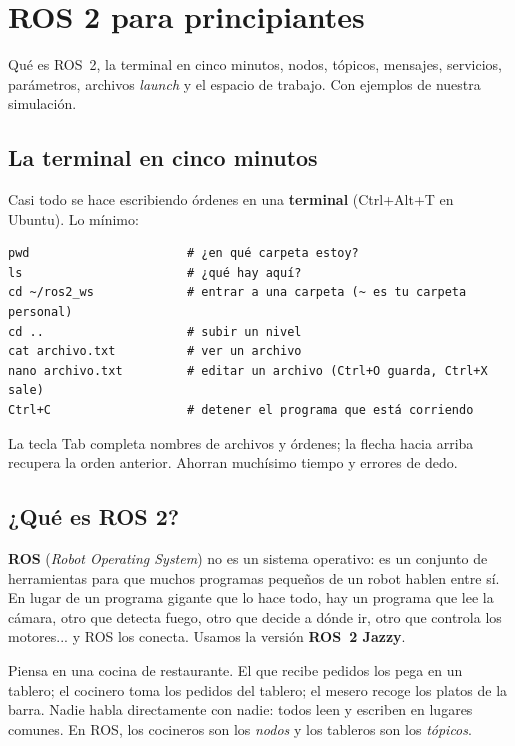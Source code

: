 \chapter{ROS 2 para principiantes}

\begin{enpocas}
Qué es ROS~2, la terminal en cinco minutos, nodos, tópicos, mensajes, servicios, parámetros,
archivos \emph{launch} y el espacio de trabajo. Con ejemplos de nuestra simulación.
\end{enpocas}

\section{La terminal en cinco minutos}

Casi todo se hace escribiendo órdenes en una \textbf{terminal} (Ctrl+Alt+T en Ubuntu). Lo mínimo:

\begin{lstlisting}[style=bash]
pwd                      # ¿en qué carpeta estoy?
ls                       # ¿qué hay aquí?
cd ~/ros2_ws             # entrar a una carpeta (~ es tu carpeta personal)
cd ..                    # subir un nivel
cat archivo.txt          # ver un archivo
nano archivo.txt         # editar un archivo (Ctrl+O guarda, Ctrl+X sale)
Ctrl+C                   # detener el programa que está corriendo
\end{lstlisting}

\begin{consejo}
La tecla Tab completa nombres de archivos y órdenes; la flecha hacia arriba recupera la orden
anterior. Ahorran muchísimo tiempo y errores de dedo.
\end{consejo}

\section{¿Qué es ROS 2?}

\textbf{ROS} (\emph{Robot Operating System}) no es un sistema operativo: es un conjunto de
herramientas para que muchos programas pequeños de un robot hablen entre sí. En lugar de un programa
gigante que lo hace todo, hay un programa que lee la cámara, otro que detecta fuego, otro que decide
a dónde ir, otro que controla los motores... y ROS los conecta. Usamos la versión \textbf{ROS~2
Jazzy}.

\begin{ejemplo}
Piensa en una cocina de restaurante. El que recibe pedidos los pega en un tablero; el cocinero toma
los pedidos del tablero; el mesero recoge los platos de la barra. Nadie habla directamente con nadie:
todos leen y escriben en lugares comunes. En ROS, los cocineros son los \emph{nodos} y los tableros
son los \emph{tópicos}.
\end{ejemplo}

